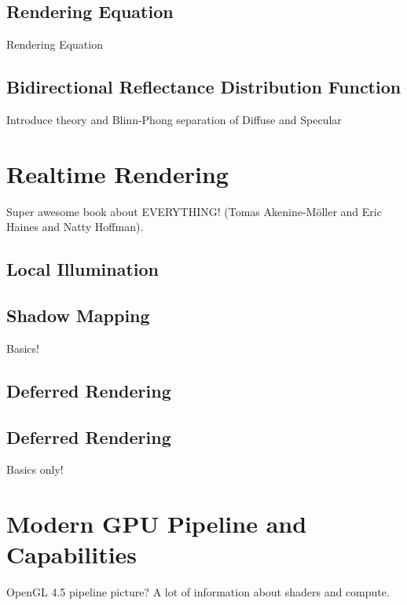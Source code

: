 \documentclass[thesis.tex]{subfiles}
\begin{document}

\subsection{Rendering Equation}
Rendering Equation

\subsection{Bidirectional Reflectance Distribution Function}
Introduce theory and Blinn-Phong
separation of Diffuse and Specular


\section{Realtime Rendering}
Super awesome book about EVERYTHING! \cite{bib:RealtimeRenderingBook} (Tomas Akenine-M\"{o}ller and Eric Haines and Natty Hoffman).

\subsection{Local Illumination}


\subsection{Shadow Mapping}
Basics!

\subsection{Deferred Rendering}


\subsection{Deferred Rendering}
Basics only!

\section{Modern GPU Pipeline and Capabilities}
OpenGL 4.5 pipeline picture?
A lot of information about shaders and compute.
\end{document}
